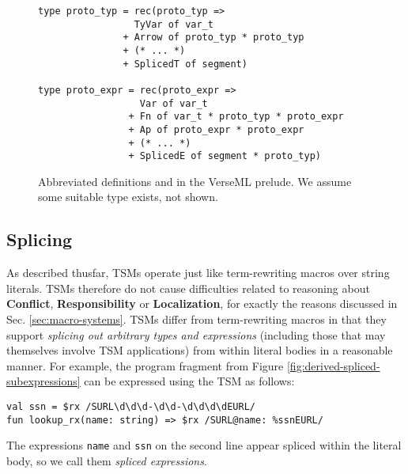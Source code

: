 \begin{figure}
\begin{lstlisting}[numbers=none]
type proto_typ = rec(proto_typ => 
                 TyVar of var_t 
               + Arrow of proto_typ * proto_typ 
               + (* ... *) 
               + SplicedT of segment)

type proto_expr = rec(proto_expr => 
                  Var of var_t 
                + Fn of var_t * proto_typ * proto_expr
                + Ap of proto_expr * proto_expr
                + (* ... *) 
                + SplicedE of segment * proto_typ)
\end{lstlisting}
\caption[Abbreviated definitions of  and  in VerseML]{Abbreviated definitions  and  in the VerseML prelude. We assume some suitable type  exists, not shown.}
\label{fig:candidate-exp-verseml}
\end{figure}


\subsection{Splicing}\label{sec:splicing-and-hygiene}
As described thusfar, TSMs operate just like term-rewriting macros over string literals. TSMs therefore do not cause difficulties related to reasoning about \textbf{Conflict}, \textbf{Responsibility} or \textbf{Localization}, for exactly the reasons discussed in Sec. \ref{sec:macro-systems}. TSMs differ from term-rewriting macros in that they support \emph{splicing out arbitrary types and expressions} (including those that may themselves involve TSM applications) from within literal bodies in a reasonable manner. For example, the program fragment from Figure \ref{fig:derived-spliced-subexpressions} can be expressed using the  TSM as follows:
\begin{lstlisting}[numbers=none]
val ssn = $rx /SURL\d\d\d-\d\d-\d\d\d\dEURL/ 
fun lookup_rx(name: string) => $rx /SURL@name: %ssnEURL/ 
\end{lstlisting}
The expressions \lstinline{name} and \lstinline{ssn} on the second line appear spliced within the literal body, so we call them \emph{spliced expressions}. 

